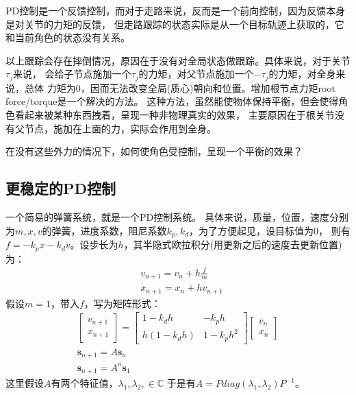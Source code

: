 \documentclass[lang=cn,newtx,10pt,scheme=chinese]{elegantbook}
\begin{document}
PD控制是一个反馈控制，而对于走路来说，反而是一个前向控制，因为反馈本身是对关节的力矩的反馈，
但走路跟踪的状态实际是从一个目标轨迹上获取的，它和当前角色的状态没有关系。

以上跟踪会存在摔倒情况，原因在于没有对全局状态做跟踪。具体来说，对于关节$\tau_j$来说，
会给子节点施加一个$\tau_j$的力矩，对父节点施加一个$-\tau_j$的力矩，对全身来说，总体
力矩为0，因而无法改变全局(质心)朝向和位置。增加根节点力矩root force/torque是一个解决的方法。
这种方法，虽然能使物体保持平衡，但会使得角色看起来被某种东西拽着，呈现一种非物理真实的效果，
主要原因在于根关节没有父节点，施加在上面的力，实际会作用到全身。

在没有这些外力的情况下，如何使角色受控制，呈现一个平衡的效果？

\subsection{更稳定的PD控制}
一个简易的弹簧系统，就是一个PD控制系统。
具体来说，质量，位置，速度分别为$m,x,v$的弹簧，进度系数，阻尼系数$k_p,k_d$，为了方便起见，设目标值为0，
则有$f=-k_p x - k_d v$。设步长为$h$，其半隐式欧拉积分(用更新之后的速度去更新位置)为：
\begin{equation}
  \begin{aligned}
  & v_{n+1}=v_n+h \frac{f}{m} \\
  & x_{n+1}=x_n+h v_{n+1}
  \end{aligned}
\end{equation}
假设$m=1$，带入$f$，写为矩阵形式：
\begin{equation}
  \begin{gathered}
  {\left[\begin{array}{l}
  v_{n+1} \\
  x_{n+1}
  \end{array}\right]=\left[\begin{array}{cc}
  1-k_d h & -k_p h \\
  h\left(1-k_d h\right) & 1-k_p h^2
  \end{array}\right]\left[\begin{array}{l}
  v_n \\
  x_n
  \end{array}\right]} \\
  \boldsymbol{s}_{n+1}=A \boldsymbol{s}_n \\
  \boldsymbol{s}_{n+1}=A^n \boldsymbol{s}_1
  \end{gathered}
\end{equation}
这里假设$A$有两个特征值，$\lambda_1, \lambda_2,\in \mathbb{C}$
于是有$A=P diag(\lambda_1, \lambda_2)P^{-1}$。
\end{document}
